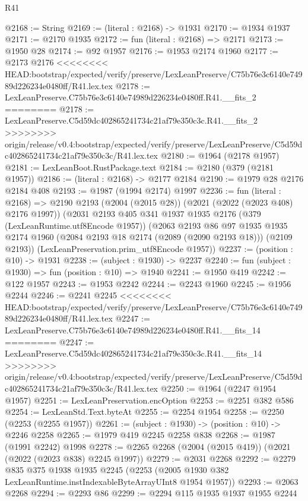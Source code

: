 \begin{lexlean}{R41}
\begin{coremodule}
{{{{{{{{{{{{{{{{{{{{{{{{{{{{{{{{{{{{{{{{{{{{{{{{{{{{{{{{{{{{{{{{{{{{{{{{{{{{{{{{{{{{{{{@2168 := String
@2169 := (literal : @2168) -> @1931
@2170 := @1934 @1937
@2171 := @2170 @1935
@2172 := fun (literal : @2168) => @2171
@2173 := @1950 @28
@2174 := @92 @1957
@2176 := @1953 @2174 @1960
@2177 := @2173 @2176
<<<<<<<< HEAD:bootstrap/expected/verify/preserve/LexLeanPreserve/C75b76e3c6140e74989d226234e0480ff/R41.lex.tex
@2178 := LexLeanPreserve.C75b76e3c6140e74989d226234e0480ff.R41.__fits_2
========
@2178 := LexLeanPreserve.C5d59dc402865241734c21af79e350c3c.R41.__fits_2
>>>>>>>> origin/release/v0.4:bootstrap/expected/verify/preserve/LexLeanPreserve/C5d59dc402865241734c21af79e350c3c/R41.lex.tex
@2180 := @1964 (@2178 @1957)
@2181 := LexLeanBoot.RustPackage.text
@2184 := @2180 (@379 (@2181 @1957))
@2186 := (literal : @2168) -> @2177 @2184
@2190 := @1979 @28 @2176 @2184 @408
@2193 := @1987 (@1994 @2174) @1997
@2236 := fun (literal : @2168) =>
  @2190
    @2193
    (@2004 (@2015 @28))
    (@2021 (@2022 (@2023 @408) @2176 @1997))
    (@2031
      @2193
      @405
      @341
      @1937
      @1935
      @2176
      (@379 (LexLeanRuntime.utf8Encode @1957))
      (@2063
        @2193
        @86
        @97
        @1935
        @1935
        @2174
        @1960
        (@2084 @2193 @18 @2174 (@2089 (@2090 @2193 @18)))
        (@2109 @2193))
      (LexLeanPreservation.prim_utf8Encode @1957))
@2237 := (position : @10) -> @1931
@2238 := (subject : @1930) -> @2237
@2240 := fun (subject : @1930) => fun (position : @10) => @1940
@2241 := @1950 @419
@2242 := @122 @1957
@2243 := @1953 @2242
@2244 := @2243 @1960
@2245 := @1956 @2244
@2246 := @2241 @2245
<<<<<<<< HEAD:bootstrap/expected/verify/preserve/LexLeanPreserve/C75b76e3c6140e74989d226234e0480ff/R41.lex.tex
@2247 := LexLeanPreserve.C75b76e3c6140e74989d226234e0480ff.R41.__fits_14
========
@2247 := LexLeanPreserve.C5d59dc402865241734c21af79e350c3c.R41.__fits_14
>>>>>>>> origin/release/v0.4:bootstrap/expected/verify/preserve/LexLeanPreserve/C5d59dc402865241734c21af79e350c3c/R41.lex.tex
@2250 := @1964 (@2247 @1954 @1957)
@2251 := LexLeanPreservation.encOption
@2253 := @2251 @382 @586
@2254 := LexLeanStd.Text.byteAt
@2255 := @2254 @1954
@2258 := @2250 (@2253 (@2255 @1957))
@2261 := (subject : @1930) -> (position : @10) -> @2246 @2258
@2265 := @1979 @419 @2245 @2258 @838
@2268 := @1987 (@1991 @2242) @1998
@2278 := @2265 @2268 (@2004 (@2015 @419)) (@2021 (@2022 (@2023 @838) @2245 @1997))
@2279 := @2031 @2268
@2292 := @2279
    @835
    @375
    @1938
    @1935
    @2245
    (@2253 (@2005 @1930 @382 LexLeanRuntime.instIndexableByteArrayUInt8 @1954 @1957))
@2293 := @2063 @2268
@2294 := @2293 @86
@2299 := @2294 @115 @1935 @1937 @1955 @2244
}}}}}}}}}}}}}}}}}}}}}}}}}}}}}}}}}}}}}}}}}}}}}}}}}}}}}}}}}}}}}}}}}}}}}}}}}}}}}}}}}}}}}}}
\end{coremodule}
\end{lexlean}
